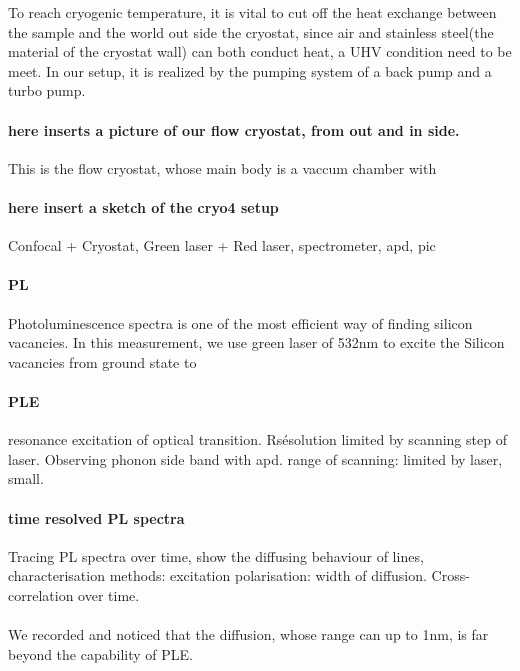 To reach cryogenic temperature, it is vital to cut off the heat exchange between the sample and the world out side the cryostat, since air and stainless steel(the material of the cryostat wall) can both conduct heat, a UHV condition need to be meet. In our setup, it is realized by the pumping system of a back pump and a turbo pump.







\paragraph{here inserts a picture of our flow cryostat, from out and in side.}
This is the flow cryostat, whose main body is a vaccum chamber with

\paragraph{here insert a sketch of the cryo4 setup}
Confocal + Cryostat, Green laser + Red laser, spectrometer, apd, pic


\paragraph{PL} Photoluminescence spectra is one of the most efficient way of finding silicon vacancies. In this measurement, we use green laser of 532nm to excite the Silicon vacancies from ground state to 

\paragraph{PLE} resonance excitation of optical transition. Rsésolution limited by scanning step of laser. Observing phonon side band with apd. range of scanning: limited by laser, small.

\paragraph{time resolved PL spectra} Tracing PL spectra over time, show the diffusing behaviour of lines, characterisation methods: excitation polarisation: width of diffusion. Cross- correlation over time.
\paragraph{}We recorded and noticed that the diffusion, whose range can up to 1nm, is far beyond the capability of PLE. 